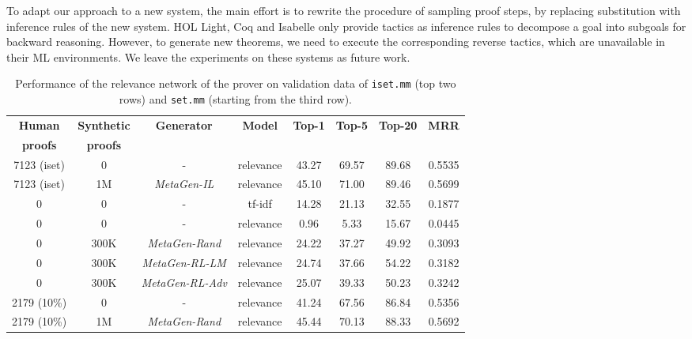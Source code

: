 \documentclass{article}
\begin{document}
To adapt our approach to a new system, 
the main effort is to rewrite 
the procedure of sampling proof steps,
by replacing substitution with 
 inference rules of the new system. 
HOL Light, Coq and Isabelle only provide
tactics as inference rules to decompose a goal into subgoals for backward reasoning.
However, to generate new theorems, we need to execute the corresponding reverse tactics, which are unavailable in their ML environments. 
We leave the experiments on these systems as future work.

\begin{table*}[t]
\caption{Performance of the relevance network of the prover on validation data of \texttt{iset.mm} (top two rows) and \texttt{set.mm} (starting from the third row).
}
\label{table:relevance}
\begin{center}
\begin{small}
\begin{sc}
\begin{tabular}{c c c c c c c c}
\toprule
\multicolumn{1}{c}{\bf Human  } 
&\multicolumn{1}{c}{\bf Synthetic  } 
&\multicolumn{1}{c}{\bf Generator}
&\multicolumn{1}{c}{\bf Model}
&\multicolumn{1}{c}{\bf Top-1}
&\multicolumn{1}{c}{\bf Top-5}
&\multicolumn{1}{c}{\bf Top-20}
&\multicolumn{1}{c}{\bf MRR}
\\ 
\multicolumn{1}{c}{\bf  proofs } 
&\multicolumn{1}{c}{\bf  proofs } 
&\multicolumn{1}{c}{\bf }
&\multicolumn{1}{c}{\bf }
&\multicolumn{1}{c}{\bf }
&\multicolumn{1}{c}{\bf }
&\multicolumn{1}{c}{\bf }
&\multicolumn{1}{c}{\bf }\\
\midrule
7123 (iset) & 0 & - & relevance & 43.27 & 69.57 & 89.68 & 0.5535 \\
7123 (iset) & 1M & \textit{MetaGen-IL} & relevance & 45.10 & 71.00 & 89.46 & 0.5699
\\ \midrule
0 & 0&- & tf-idf & 14.28 & 21.13 & 32.55 &0.1877 \\
0 & 0&- & relevance & 0.96 & 5.33 & 15.67 & 0.0445 \\
0 & 300K &\textit{MetaGen-Rand}& relevance & 24.22 & 37.27 & 49.92 & 0.3093 \\
0 & 300K &\textit{MetaGen-RL-LM}& relevance & 24.74 & 37.66 & 54.22 & 0.3182 \\ 
0 & 300K &\textit{MetaGen-RL-Adv}& relevance & 25.07 & 39.33 & 50.23 & 0.3242 \\\midrule
2179 (10\%) & 0 & -&  relevance& 41.24 & 67.56 & 86.84 & 0.5356 \\
2179 (10\%) & 1M&\textit{MetaGen-Rand}& relevance& 45.44 & 70.13 & 88.33 & 0.5692 \\

\end{tabular}
\end{sc}
\end{small}
\end{center}
\end{table*}
\end{document}
